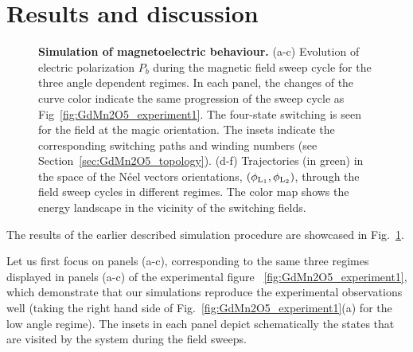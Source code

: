 \section{Results and discussion}
\begin{figure}
    \caption{\label{fig:GdMn2O5_theory}{\bf Simulation of magnetoelectric behaviour.}
    (a-c) Evolution of electric polarization $P_b$ during the magnetic field sweep cycle for the three angle dependent regimes. 
   In each panel, the changes of the curve color indicate the same progression of the sweep cycle as Fig~\ref{fig:GdMn2O5_experiment1}. The four-state switching is seen for the field at the magic orientation. 
    The insets indicate the corresponding switching paths and winding numbers (see Section~\ref{sec:GdMn2O5_topology}).
    (d-f) Trajectories (in green) in the space of the N\'eel vectors orientations, $(\phi_{\rm L_1},\phi_{\rm L_2})$, through the field sweep cycles in different regimes. The color map shows the energy landscape in the vicinity of the switching fields. 
}
\end{figure}

The results of the earlier described simulation procedure are showcased in Fig.~\ref{fig:GdMn2O5_theory}.

Let us first focus on panels (a-c), corresponding to the same three regimes displayed in panels (a-c) of the experimental figure ~\ref{fig:GdMn2O5_experiment1}, which demonstrate that our simulations reproduce the experimental observations well (taking the right hand side of Fig.~\ref{fig:GdMn2O5_experiment1}(a) for the low angle regime).
The insets in each panel depict schematically the states that are visited by the system during the field sweeps.

